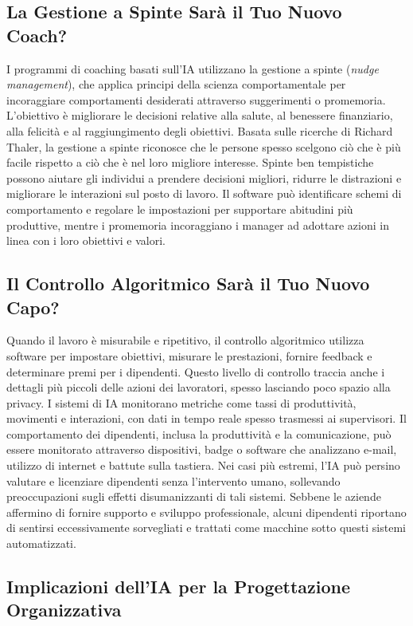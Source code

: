 \documentclass{article}
\begin{document}
\subsection{La Gestione a Spinte Sarà il Tuo Nuovo Coach?}

I programmi di coaching basati sull'IA utilizzano la gestione a spinte (\textit{nudge management}), che applica principi della scienza comportamentale per incoraggiare comportamenti desiderati attraverso suggerimenti o promemoria. L'obiettivo è migliorare le decisioni relative alla salute, al benessere finanziario, alla felicità e al raggiungimento degli obiettivi. Basata sulle ricerche di Richard Thaler, la gestione a spinte riconosce che le persone spesso scelgono ciò che è più facile rispetto a ciò che è nel loro migliore interesse. Spinte ben tempistiche possono aiutare gli individui a prendere decisioni migliori, ridurre le distrazioni e migliorare le interazioni sul posto di lavoro. Il software può identificare schemi di comportamento e regolare le impostazioni per supportare abitudini più produttive, mentre i promemoria incoraggiano i manager ad adottare azioni in linea con i loro obiettivi e valori.

\subsection{Il Controllo Algoritmico Sarà il Tuo Nuovo Capo?}

Quando il lavoro è misurabile e ripetitivo, il controllo algoritmico utilizza software per impostare obiettivi, misurare le prestazioni, fornire feedback e determinare premi per i dipendenti. Questo livello di controllo traccia anche i dettagli più piccoli delle azioni dei lavoratori, spesso lasciando poco spazio alla privacy. I sistemi di IA monitorano metriche come tassi di produttività, movimenti e interazioni, con dati in tempo reale spesso trasmessi ai supervisori. Il comportamento dei dipendenti, inclusa la produttività e la comunicazione, può essere monitorato attraverso dispositivi, badge o software che analizzano e-mail, utilizzo di internet e battute sulla tastiera. Nei casi più estremi, l'IA può persino valutare e licenziare dipendenti senza l'intervento umano, sollevando preoccupazioni sugli effetti disumanizzanti di tali sistemi. Sebbene le aziende affermino di fornire supporto e sviluppo professionale, alcuni dipendenti riportano di sentirsi eccessivamente sorvegliati e trattati come macchine sotto questi sistemi automatizzati.

\subsection{Implicazioni dell'IA per la Progettazione Organizzativa}
\end{document}
